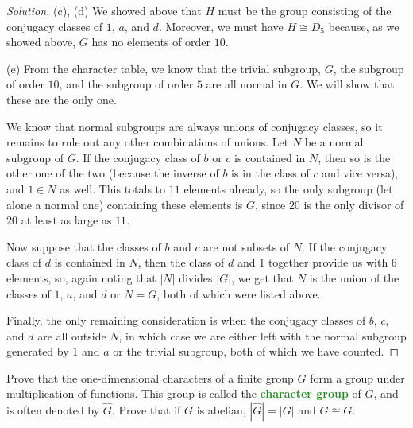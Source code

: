 \documentclass[10pt]{scrartcl}
\newenvironment{soln}{\begin{proof}[Solution]}{\end{proof}}
\providecommand{\vocab}[1]{{\textbf{\textcolor{ForestGreen}{#1}}}}
\begin{document}
\begin{soln}
	(c), (d) We showed above that $H$ must be the group
	consisting of the conjugacy classes of $1$, $a$, and $d$.
	Moreover, we must have $H\cong D_5$ because, as we showed above,
	$G$ has no elements of order $10$.
	
	(e) From the character table, we know that the trivial subgroup,
	$G$, the subgroup of order $10$, and the subgroup of order $5$
	are all normal in $G$. We will show that these are the only one.
	
	We know that normal subgroups are always unions of conjugacy classes,
	so it remains to rule out any other combinations of unions.
	Let $N$ be a normal subgroup of $G$.
	If the conjugacy class of $b$ or $c$ is contained in $N$,
	then so is the other one of the two (because the inverse of
	$b$ is in the class of $c$ and vice versa), and $1\in N$ as well.
	This totals to $11$ elements already, so the only subgroup
	(let alone a normal one) containing these elements is $G$,
	since $20$ is the only divisor of $20$ at least as large as $11$.
	
	Now suppose that the classes of $b$ and $c$ are not subsets of $N$.
	If the conjugacy class of $d$ is contained in $N$, then
	the class of $d$ and $1$ together provide us with $6$ elements,
	so, again noting that $|N|$ divides $|G|$, we get that
	$N$ is the union of the classes of $1$, $a$, and $d$
	or $N = G$, both of which were listed above.
	
	Finally, the only remaining consideration is when
	the conjugacy classes of $b$, $c$, and $d$ are all outside $N$,
	in which case we are either left with the normal subgroup generated by
	$1$ and $a$ or the trivial subgroup, both of which we have counted.
\end{soln}

\begin{problem*}[5.5]
	Prove that the one-dimensional characters of a finite group $G$
	form a group under multiplication of functions.
	This group is called the \vocab{character group} of $G$,
	and is often denoted by $\widehat G$. Prove that if $G$ is abelian,
	$|\widehat G| = |G|$ and $\widehat G\cong G$.
\end{problem*}
\end{document}
